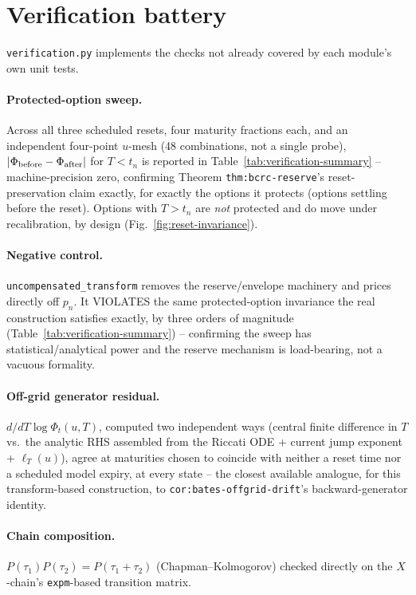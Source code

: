 \section{Verification battery}
\label{sec:verification}

\texttt{verification.py} implements the checks not already covered by each
module's own unit tests.

\paragraph{Protected-option sweep.} Across all three scheduled resets, four
maturity fractions each, and an independent four-point $u$-mesh (48
combinations, not a single probe), $|\Phi_{\rm before}-\Phi_{\rm after}|$ for
$T<t_n$ is reported in Table~\ref{tab:verification-summary} -- machine-precision
zero, confirming Theorem \texttt{thm:bcrc-reserve}'s reset-preservation
claim exactly, for exactly the options it protects (options settling before
the reset). Options with $T>t_n$ are \emph{not} protected and do move under
recalibration, by design (Fig.~\ref{fig:reset-invariance}).

\paragraph{Negative control.} \texttt{uncompensated\_transform} removes the
reserve/envelope machinery and prices directly off $p_n$. It VIOLATES the
same protected-option invariance the real construction satisfies exactly,
by three orders of magnitude (Table~\ref{tab:verification-summary}) --
confirming the sweep has statistical/analytical power and the reserve
mechanism is load-bearing, not a vacuous formality.

\paragraph{Off-grid generator residual.} $d/dT\log\Phi_t(u,T)$, computed two
independent ways (central finite difference in $T$ vs.\ the analytic RHS
assembled from the Riccati ODE + current jump exponent + $\ell_T(u)$), agree
at maturities chosen to coincide with neither a reset time nor a scheduled
model expiry, at every state -- the closest available analogue, for this
transform-based construction, to \texttt{cor:bates-offgrid-drift}'s
backward-generator identity.

\paragraph{Chain composition.} $P(\tau_1)P(\tau_2)=P(\tau_1+\tau_2)$ (Chapman--Kolmogorov)
checked directly on the $X$-chain's \texttt{expm}-based transition matrix.

